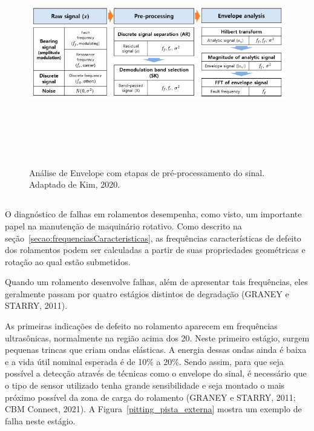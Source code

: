 \documentclass[
	12pt,				
	oneside,			
	a4paper,			
	english,			
	brazil,			
	]{abntex2ppgsi}
\begin{document}
\begin{figure}[H]
\centering
\caption {Análise de Envelope com etapas de pré-processamento do sinal. Adaptado de Kim, 2020.}
\includegraphics[width=\textwidth,height=90mm,keepaspectratio]{envelope_kim}
\label{envelope_kim}
\end{figure}

\subsection{}

O diagnóstico de falhas em rolamentos desempenha, como visto, um importante papel na manutenção de maquinário rotativo. Como descrito na seção~\ref{secao:frequenciasCaracteristicas}, as frequências características de defeito dos rolamentos podem ser calculadas a partir de suas propriedades geométricas e rotação ao qual estão submetidos. 

Quando um rolamento desenvolve falhas, além de apresentar tais frequências, eles geralmente passam por quatro estágios distintos de degradação (GRANEY e STARRY, 2011). 

As primeiras indicações de defeito no rolamento aparecem em frequências ultrasônicas, normalmente na região acima dos \SI{20}{\kilo{\hertz}}. Neste primeiro estágio, surgem pequenas trincas que criam ondas elásticas. A energia dessas ondas ainda é baixa e a vida útil nominal esperada é de 10\% a 20\%. Sendo assim, para que seja possível a detecção através de técnicas como o envelope do sinal, é necessário que o tipo de sensor utilizado tenha grande sensibilidade e seja montado o mais próximo possível da zona de carga do rolamento (GRANEY e STARRY, 2011; CBM Connect, 2021). A Figura~\ref{pitting_pista_externa} mostra um exemplo de falha neste estágio.
\end{document}
